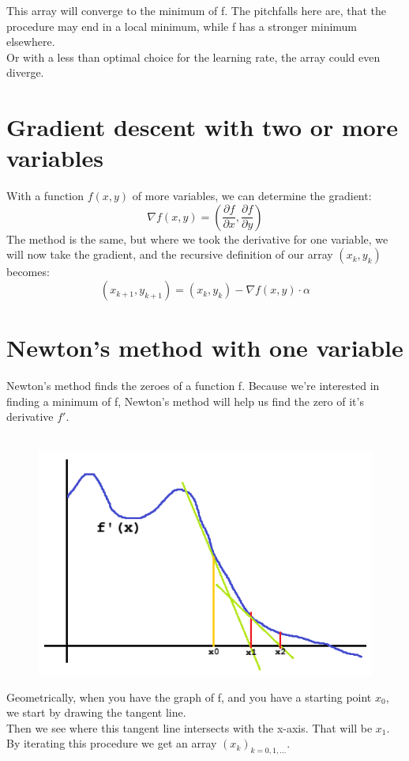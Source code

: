 \documentclass[12pt, letterpaper]{article}
\begin{document}
This array will converge to the minimum of f.
The pitchfalls here are, that the procedure may end in a local minimum, while f has a stronger minimum elsewhere.\\
Or with a less than optimal choice for the learning rate, the array could even diverge.

\section{Gradient descent with two or more variables}
With a function $f(x, y)$ of more variables, we can determine the gradient:
\[
\nabla f(x,y) = \left( \frac{\partial f}{\partial x}, \frac{\partial f}{\partial y} \right)
\]
The method is the same, but where we took the derivative for one variable, we will now take the gradient, and the recursive definition of our array  $(x_k,y_k)$ becomes:\\
\[(x_{k+1},y_{k+1}) = (x_k,y_k) - \nabla f(x,y) \cdot \alpha\]


\section{Newton's method with one variable}
Newton's method finds the zeroes of a function f. Because we're interested in finding a minimum of f,
Newton's method will help us find the zero of it's derivative $f'$.\\
\\
\begin{figure}[H]
    \includegraphics{fx_example_02.png}
\end{figure}
Geometrically, when you have the graph of f, and you have a starting point $x_0$, we start by drawing the tangent line.\\
Then we see where this tangent line intersects with the x-axis. That will be $x_1$.\\
By iterating this procedure we get an array $(x_k)_{k=0,1,\ldots}$.
\end{document}
